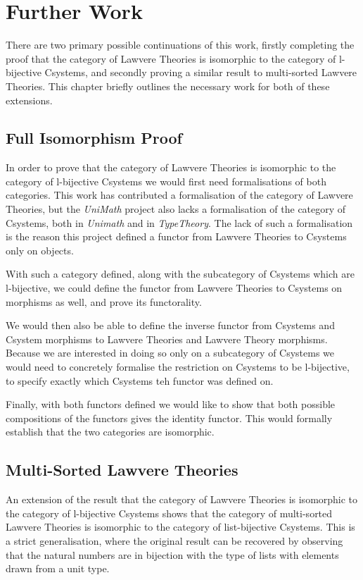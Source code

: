 \chapter{Further Work}
There are two primary possible continuations of this work, firstly completing
the proof that the category of Lawvere Theories is isomorphic to the category of
l-bijective Csystems, and secondly proving a similar result to multi-sorted
Lawvere Theories. This chapter briefly outlines the necessary work for both of
these extensions.

\section{Full Isomorphism Proof}
In order to prove that the category of Lawvere Theories is isomorphic to the
category of l-bijective Csystems we would first need formalisations of both
categories. This work has contributed a formalisation of the category of Lawvere
Theories, but the \textit{UniMath} project also lacks a formalisation of the
category of Csystems, both in \textit{Unimath} and in \textit{TypeTheory}. The
lack of such a formalisation is the reason this project defined a functor from
Lawvere Theories to Csystems only on objects.

With such a category defined, along with the subcategory of Csystems which are
l-bijective, we could define the functor from Lawvere Theories to Csystems on
morphisms as well, and prove its functorality.

We would then also be able to define the inverse functor from Csystems and
Csystem morphisms to Lawvere Theories and Lawvere Theory morphisms. Because we
are interested in doing so only on a subcategory of Csystems we would need to
concretely formalise the restriction on Csystems to be l-bijective, to specify
exactly which Csystems teh functor was defined on.

Finally, with both functors defined we would like to show that both possible
compositions of the functors gives the identity functor. This would formally
establish that the two categories are isomorphic.

\section{Multi-Sorted Lawvere Theories}
An extension of the result that the category of Lawvere Theories is isomorphic
to the category of l-bijective Csystems shows that the category of multi-sorted
Lawvere Theories is isomorphic to the category of list-bijective Csystems. This
is a strict generalisation, where the original result can be recovered by
observing that the natural numbers are in bijection with the type of lists with
elements drawn from a unit type.